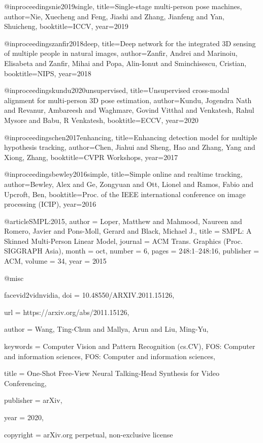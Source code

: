 @inproceedings{nie2019single,
  title={Single-stage multi-person pose machines},
  author={Nie, Xuecheng and Feng, Jiashi and Zhang, Jianfeng and Yan, Shuicheng},
  booktitle=ICCV,
  year={2019}
}

@inproceedings{zanfir2018deep,
  title={Deep network for the integrated {3D} sensing of multiple people in natural images},
  author={Zanfir, Andrei and Marinoiu, Elisabeta and Zanfir, Mihai and Popa, Alin-Ionut and Sminchisescu, Cristian},
  booktitle=NIPS,
  year={2018}
}

@inproceedings{kundu2020unsupervised,
  title={Unsupervised cross-modal alignment for multi-person {3D} pose estimation},
  author={Kundu, Jogendra Nath and Revanur, Ambareesh and Waghmare, Govind Vitthal and Venkatesh, Rahul Mysore and Babu, R Venkatesh},
  booktitle=ECCV,
  year={2020}
}

@inproceedings{chen2017enhancing,
  title={Enhancing detection model for multiple hypothesis tracking},
  author={Chen, Jiahui and Sheng, Hao and Zhang, Yang and Xiong, Zhang},
  booktitle={CVPR Workshops},
  year={2017}
}

@inproceedings{bewley2016simple,
  title={Simple online and realtime tracking},
  author={Bewley, Alex and Ge, Zongyuan and Ott, Lionel and Ramos, Fabio and Upcroft, Ben},
  booktitle={Proc. of the IEEE international conference on image processing (ICIP)},
  year={2016}
}

@article{SMPL:2015,
      author = {Loper, Matthew and Mahmood, Naureen and Romero, Javier and Pons-Moll, Gerard and Black, Michael J.},
      title = {{SMPL}: A Skinned Multi-Person Linear Model},
      journal = {ACM Trans. Graphics (Proc. SIGGRAPH Asia)},
      month = oct,
      number = {6},
      pages = {248:1--248:16},
      publisher = {ACM},
      volume = {34},
      year = {2015}
    }

@misc{facevid2vidnvidia,
  doi = {10.48550/ARXIV.2011.15126},
  
  url = {https://arxiv.org/abs/2011.15126},
  
  author = {Wang, Ting-Chun and Mallya, Arun and Liu, Ming-Yu},
  
  keywords = {Computer Vision and Pattern Recognition (cs.CV), FOS: Computer and information sciences, FOS: Computer and information sciences},
  
  title = {One-Shot Free-View Neural Talking-Head Synthesis for Video Conferencing},
  
  publisher = {arXiv},
  
  year = {2020},
  
  copyright = {arXiv.org perpetual, non-exclusive license}
}

